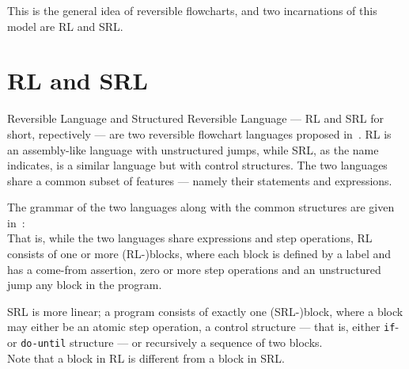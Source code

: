 
\noindent This is the general idea of reversible flowcharts, and two incarnations of this model are RL and SRL.\

\section*{RL and SRL}
\noindent Reversible Language and Structured Reversible Language --- RL and SRL for short, repectively --- are two reversible flowchart languages proposed in~\cite{REV}. RL is an assembly-like language with unstructured jumps, while SRL, as the name indicates, is a similar language but with control structures. The two languages share a common subset of features --- namely their statements and expressions.

The grammar of the two languages along with the common structures are given in~\cite{REV}:\\


\noindent That is, while the two languages share expressions and step operations, RL consists of one or more (RL-)blocks, where each block is defined by a label and has a come-from assertion, zero or more step operations and an unstructured jump any block in the program.

SRL is more linear; a program consists of exactly one (SRL-)block, where a block may either be an atomic step operation, a control structure --- that is, either \texttt{if}- or \texttt{do-until} structure --- or recursively a sequence of two blocks.\\

\noindent Note that a block in RL is different from a block in SRL.\
